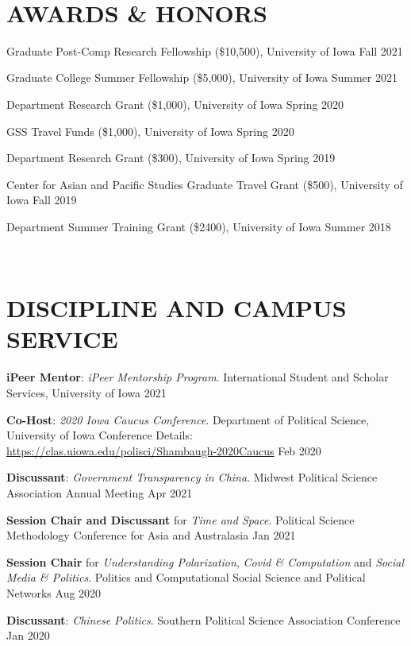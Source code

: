 \documentclass[10.5pt,]{article}
\providecommand{\tightlist}{%
	\setlength{\itemsep}{0pt}\setlength{\parskip}{0pt}}
\renewenvironment{itemize}{
	\begin{list}{}{
			\setlength{\leftmargin}{1.5em}
		}
	}{
	\end{list}
}
\begin{document}
 ~

 \hypertarget{awards-honors}{%
 \section{AWARDS \& HONORS}\label{awards-honors}}

 \begin{itemize}
 \tightlist
 \item
   Graduate Post-Comp Research Fellowship (\$10,500), University of Iowa
   \hfill Fall 2021
 \item
   Graduate College Summer Fellowship (\$5,000), University of Iowa
   \hfill Summer 2021
 \item
   Department Research Grant (\$1,000), University of Iowa \hfill Spring
   2020
 \item
   GSS Travel Funds (\$1,000), University of Iowa \hfill Spring 2020
 \item
   Department Research Grant (\$300), University of Iowa \hfill Spring
   2019
 \item
   Center for Asian and Pacific Studies Graduate Travel Grant (\$500),
   University of Iowa \hfill Fall 2019
 \item
   Department Summer Training Grant (\$2400), University of Iowa
   \hfill Summer 2018
 \end{itemize}

 ~

 \hypertarget{discipline-and-campus-service}{%
 \section{DISCIPLINE AND CAMPUS
 SERVICE}\label{discipline-and-campus-service}}

 \begin{itemize}
 \item
   \textbf{iPeer Mentor}: \emph{iPeer Mentorship Program}. International
   Student and Scholar Services, University of Iowa \hfill  2021
 \item
   \textbf{Co-Host}: \emph{2020 Iowa Caucus Conference}. Department of
   Political Science, University of Iowa Conference Details:
   \url{https://clas.uiowa.edu/polisci/Shambaugh-2020Caucus} \hfill  Feb
   2020
 \item
   \textbf{Discussant}: \emph{Government Transparency in China}. Midwest
   Political Science Association Annual Meeting \hfill  Apr 2021
 \item
   \textbf{Session Chair and Discussant} for \emph{Time and Space}.
   Political Science Methodology Conference for Asia and Australasia
   \hfill  Jan 2021
 \item
   \textbf{Session Chair} for \emph{Understanding Polarization},
   \emph{Covid \& Computation} and \emph{Social Media \& Politics}.
   Politics and Computational Social Science and Political Networks
   \hfill  Aug 2020
 \item
   \textbf{Discussant}: \emph{Chinese Politics}. Southern Political
   Science Association Conference \hfill  Jan 2020
 \end{itemize}
\end{document}
